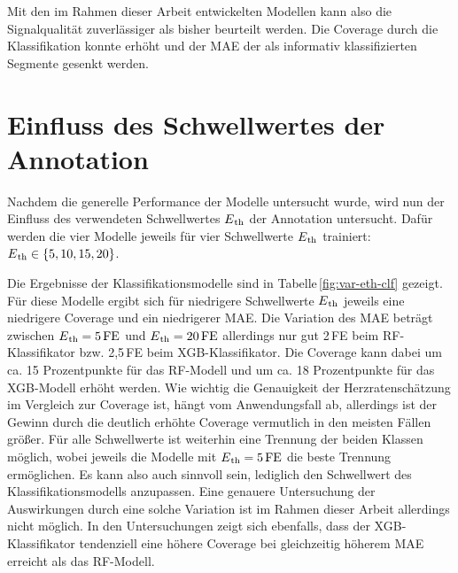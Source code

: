  Mit den im Rahmen dieser Arbeit entwickelten Modellen kann also die Signalqualität zuverlässiger als bisher beurteilt werden. Die Coverage durch die Klassifikation konnte erhöht und der \ac{MAE} der als informativ klassifizierten Segmente gesenkt werden.

\section{Einfluss des Schwellwertes der Annotation}

Nachdem die generelle Performance der Modelle untersucht wurde, wird nun der Einfluss des verwendeten Schwellwertes $E\textsubscript{th}$ der Annotation untersucht. Dafür werden die vier Modelle jeweils für vier Schwellwerte $E\textsubscript{th}$ trainiert: $E\textsubscript{th} \in \{5, 10, 15, 20\}$.

Die Ergebnisse der Klassifikationsmodelle sind in Tabelle\,\ref{fig:var-eth-clf} gezeigt. Für diese Modelle ergibt sich für niedrigere Schwellwerte $E\textsubscript{th}$ jeweils eine niedrigere Coverage und ein niedrigerer \ac{MAE}. Die Variation des \ac{MAE} beträgt zwischen $E\textsubscript{th}= 5\,\si{FE}$ und $E\textsubscript{th} = 20\,\si{FE}$ allerdings nur gut 2\,\si{FE} beim \ac{RF}-Klassifikator bzw. 2,5\,\si{FE} beim \ac{XGB}-Klassifikator. Die Coverage kann dabei um ca. 15 Prozentpunkte für das \ac{RF}-Modell und um ca. 18 Prozentpunkte für das \ac{XGB}-Modell erhöht werden. Wie wichtig die Genauigkeit der Herzratenschätzung im Vergleich zur Coverage ist, hängt vom Anwendungsfall ab, allerdings ist der Gewinn durch die deutlich erhöhte Coverage vermutlich in den meisten Fällen größer. Für alle Schwellwerte ist weiterhin eine Trennung der beiden Klassen möglich, wobei jeweils die Modelle mit $E\textsubscript{th}= 5\text{\,}\si{FE}$ die beste Trennung ermöglichen. Es kann also auch sinnvoll sein, lediglich den Schwellwert des Klassifikationsmodells anzupassen. Eine genauere Untersuchung der Auswirkungen durch eine solche Variation ist im Rahmen dieser Arbeit allerdings nicht möglich. In den Untersuchungen zeigt sich ebenfalls, dass der \ac{XGB}-Klassifikator tendenziell eine höhere Coverage bei gleichzeitig höherem \ac{MAE} erreicht als das \ac{RF}-Modell.

